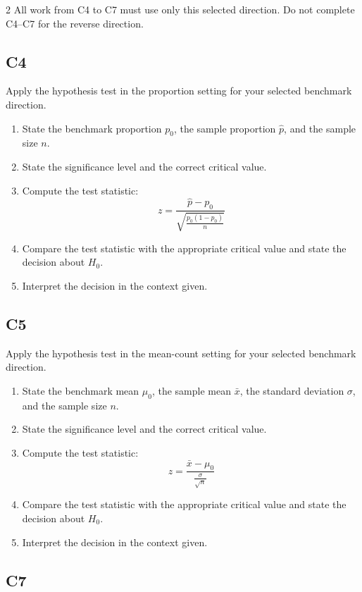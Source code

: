 \documentclass[12pt]{article}
\begin{document}
\begin{multicols}{2}
		All work from C4 to C7 must use only this selected direction. Do not complete C4--C7 for the reverse direction.
		
		\subsection*{C4}
		
		Apply the hypothesis test in the proportion setting for your selected benchmark direction.
		
		\begin{enumerate}
			\item State the benchmark proportion \(p_0\), the sample proportion \(\hat p\), and the sample size \(n\).
			\item State the significance level and the correct critical value.
			\item Compute the test statistic:
			\[
			z=\dfrac{\hat p-p_0}{\sqrt{\frac{p_0(1-p_0)}{n}}}
			\]
			\item Compare the test statistic with the appropriate critical value and state the decision about \(H_0\).
			\item Interpret the decision in the context given.
		\end{enumerate}
		
		\subsection*{C5}
		
		Apply the hypothesis test in the mean-count setting for your selected benchmark direction.
		
		\begin{enumerate}
			\item State the benchmark mean \(\mu_0\), the sample mean \(\bar x\), the standard deviation \(\sigma\), and the sample size \(n\).
			\item State the significance level and the correct critical value.
			\item Compute the test statistic:
			\[
			z=\dfrac{\bar x-\mu_0}{\frac{\sigma}{\sqrt{n}}}
			\]
			\item Compare the test statistic with the appropriate critical value and state the decision about \(H_0\).
			\item Interpret the decision in the context given.
		\end{enumerate}
		
		\subsection*{C7}
		

\end{multicols}
\end{document}
